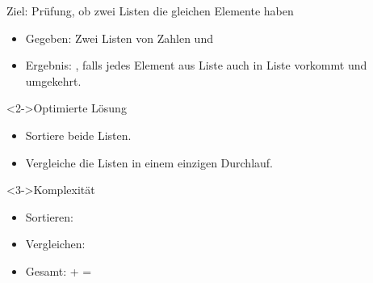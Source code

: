 \begin{frame}
    \begin{block}{Ziel: Prüfung, ob zwei Listen die gleichen Elemente haben}
        \begin{itemize}
            \item Gegeben: Zwei Listen von Zahlen  und 
            \item Ergebnis: , falls jedes Element aus Liste  auch in Liste  vorkommt und umgekehrt.
        \end{itemize}
    \end{block}
    \begin{block}<2->{Optimierte Lösung}
        \begin{itemize}
            \item Sortiere beide Listen.
            \item Vergleiche die Listen in einem einzigen Durchlauf.
        \end{itemize}
    \end{block}
    \begin{block}<3->{Komplexität}
        \begin{itemize}
            \item Sortieren: \onlog
            \item Vergleichen: \olin
            \item \alert{Gesamt}: \onlog + \olin = \alert{\onlog}
        \end{itemize}
    \end{block}
\end{frame}

